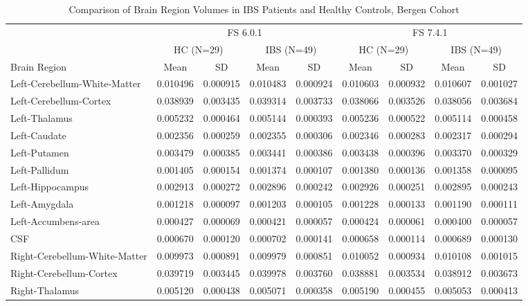 \begin{table}[H]
\setlength{\tabcolsep}{5pt}
\scriptsize
\centering
\caption{Comparison of Brain Region Volumes in IBS Patients and Healthy Controls, Bergen Cohort}
\begin{tabular}{l|cc|cc|cc|cc}
\hline
 & \multicolumn{4}{c|}{FS 6.0.1} & \multicolumn{4}{c}{FS 7.4.1} \\
 & \multicolumn{2}{c|}{HC (N=29)} & \multicolumn{2}{c|}{IBS (N=49)} & \multicolumn{2}{c|}{HC (N=29)} & \multicolumn{2}{c}{IBS (N=49)} \\
Brain Region & Mean & SD & Mean & SD & Mean & SD & Mean & SD \\
\hline
Left-Cerebellum-White-Matter & 0.010496 & 0.000915 & 0.010483 & 0.000924 & 0.010603 & 0.000932 & 0.010607 & 0.001027 \\
Left-Cerebellum-Cortex & 0.038939 & 0.003435 & 0.039314 & 0.003733 & 0.038066 & 0.003526 & 0.038056 & 0.003684 \\
Left-Thalamus & 0.005232 & 0.000464 & 0.005144 & 0.000393 & 0.005236 & 0.000522 & 0.005114 & 0.000458 \\
Left-Caudate & 0.002356 & 0.000259 & 0.002355 & 0.000306 & 0.002346 & 0.000283 & 0.002317 & 0.000294 \\
Left-Putamen & 0.003479 & 0.000385 & 0.003441 & 0.000386 & 0.003438 & 0.000396 & 0.003370 & 0.000329 \\
Left-Pallidum & 0.001405 & 0.000154 & 0.001374 & 0.000107 & 0.001380 & 0.000136 & 0.001358 & 0.000095 \\
Left-Hippocampus & 0.002913 & 0.000272 & 0.002896 & 0.000242 & 0.002926 & 0.000251 & 0.002895 & 0.000243 \\
Left-Amygdala & 0.001218 & 0.000097 & 0.001203 & 0.000105 & 0.001228 & 0.000133 & 0.001190 & 0.000111 \\
Left-Accumbens-area & 0.000427 & 0.000069 & 0.000421 & 0.000057 & 0.000424 & 0.000061 & 0.000400 & 0.000057 \\
CSF & 0.000670 & 0.000120 & 0.000702 & 0.000141 & 0.000658 & 0.000114 & 0.000689 & 0.000130 \\
Right-Cerebellum-White-Matter & 0.009973 & 0.000891 & 0.009979 & 0.000851 & 0.010052 & 0.000934 & 0.010108 & 0.001015 \\
Right-Cerebellum-Cortex & 0.039719 & 0.003445 & 0.039978 & 0.003760 & 0.038881 & 0.003534 & 0.038912 & 0.003673 \\
Right-Thalamus & 0.005120 & 0.000438 & 0.005071 & 0.000358 & 0.005190 & 0.000455 & 0.005053 & 0.000413 \\

\end{tabular}
\end{table}

